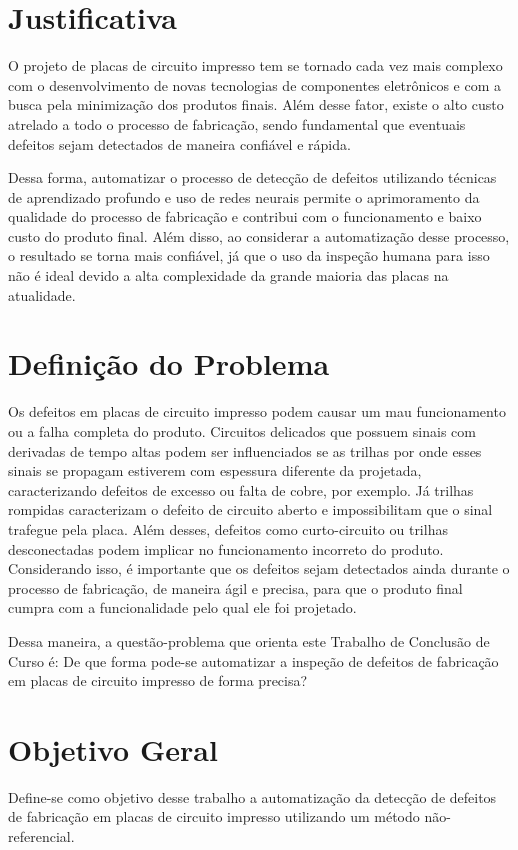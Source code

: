 \section{Justificativa}
O projeto de placas de circuito impresso tem se tornado cada vez mais complexo com o desenvolvimento de novas tecnologias de componentes eletrônicos e com a busca pela minimização dos produtos finais.
Além desse fator, existe o alto custo atrelado a todo o processo de fabricação, sendo fundamental que eventuais defeitos sejam detectados de maneira confiável e rápida.

Dessa forma, automatizar o processo de detecção de defeitos utilizando técnicas de aprendizado profundo e uso de redes neurais permite o aprimoramento da qualidade do processo de fabricação e contribui com o funcionamento e baixo custo do produto final. Além disso, ao considerar a automatização desse processo, o resultado se torna mais confiável, já que o uso da inspeção humana para isso não é ideal devido a alta complexidade da grande maioria das placas na atualidade.

\section{Definição do Problema}
Os defeitos em placas de circuito impresso podem causar um mau funcionamento ou a falha completa do produto. Circuitos delicados que possuem sinais com derivadas de tempo altas podem ser influenciados se as trilhas por onde esses sinais se propagam estiverem com espessura diferente da projetada, caracterizando defeitos de excesso ou falta de cobre, por exemplo. Já trilhas rompidas caracterizam o defeito de circuito aberto e impossibilitam que o sinal trafegue pela placa. Além desses, defeitos como curto-circuito ou trilhas desconectadas podem implicar no funcionamento incorreto do produto. Considerando isso, é importante que os defeitos sejam detectados ainda durante o processo de fabricação, de maneira ágil e precisa, para que o produto final cumpra com a funcionalidade pelo qual ele foi projetado.

Dessa maneira, a questão-problema que orienta este Trabalho de Conclusão de Curso é: De que forma pode-se automatizar a inspeção de defeitos de fabricação em placas de circuito impresso de forma precisa?

\section{Objetivo Geral}
Define-se como objetivo desse trabalho a automatização da detecção de defeitos de fabricação em placas de circuito impresso utilizando um método não-referencial.

